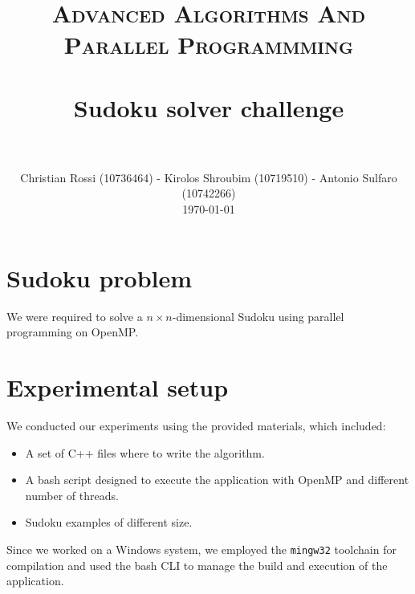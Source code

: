 \documentclass[paper=a4, fontsize=12pt]{scrartcl}
\title{
		\vspace{-1in} 	
		\usefont{OT1}{bch}{b}{n}
		\normalfont \normalsize \textsc{Advanced Algorithms And Parallel Programmming} \\ [25pt]
		\horrule{0.5pt} \\[0.4cm]
		\huge Sudoku solver challenge \\
		\horrule{2pt} \\[0.5cm]
}
\author{
		\normalfont 								\normalsize
        Christian Rossi (10736464) - Kirolos Shroubim (10719510) - Antonio Sulfaro (10742266)\\[-3pt]		\normalsize
        \today
}
\date{}
\numberwithin{equation}{section}
\numberwithin{figure}{section}
\numberwithin{table}{section}
\begin{document}
    \maketitle

    \section{Sudoku problem}
    We were required to solve a $n\times n$-dimensional Sudoku using parallel programming on OpenMP.

    \section{Experimental setup}
    We conducted our experiments using the provided materials, which included:
    \begin{itemize}
        \item A set of C++ files where to write the algorithm.
        \item A bash script designed to execute the application with OpenMP and different number of threads.
        \item Sudoku examples of different size. 
    \end{itemize}
    Since we worked on a Windows system, we employed the \texttt{mingw32} toolchain for compilation and used the bash CLI to manage the build and execution of the application.
    
\end{document}
